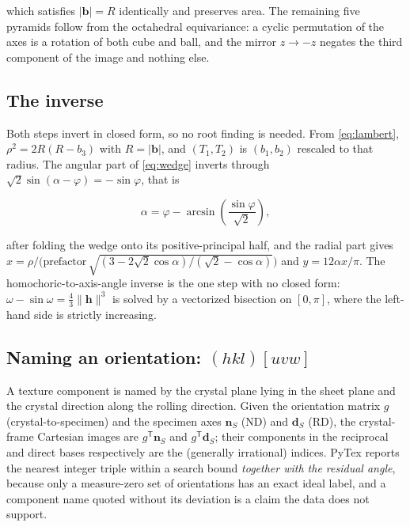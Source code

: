 which satisfies \(|\mathbf{b}| = R\) identically and preserves area. The remaining five
pyramids follow from the octahedral equivariance: a cyclic permutation of the axes is a
rotation of both cube and ball, and the mirror \(z \to -z\) negates the third component of the
image and nothing else.

\subsection{The inverse}

Both steps invert in closed form, so no root finding is needed. From \eqref{eq:lambert},
\(\rho^{2} = 2R(R - b_{3})\) with \(R = |\mathbf{b}|\), and \((T_{1},T_{2})\) is
\((b_{1},b_{2})\) rescaled to that radius. The angular part of \eqref{eq:wedge} inverts
through \(\sqrt{2}\sin(\alpha - \varphi) = -\sin\varphi\), that is

\begin{equation}
  \alpha = \varphi - \arcsin\!\left(\frac{\sin\varphi}{\sqrt{2}}\right),
\end{equation}

after folding the wedge onto its positive-principal half, and the radial part gives
\(x = \rho\big/\big(\text{prefactor}\,\sqrt{(3-2\sqrt{2}\cos\alpha)/(\sqrt{2}-\cos\alpha)}\big)\)
and \(y = 12\alpha x/\pi\). The homochoric-to-axis-angle inverse is the one step with no
closed form: \(\omega - \sin\omega = \tfrac{4}{3}\|\mathbf{h}\|^{3}\) is solved by a
vectorized bisection on \([0,\pi]\), where the left-hand side is strictly increasing.

\subsection{Naming an orientation: \texorpdfstring{\((hkl)[uvw]\)}{(hkl)[uvw]}}

A texture component is named by the crystal plane lying in the sheet plane and the crystal
direction along the rolling direction. Given the orientation matrix \(g\)
(crystal-to-specimen) and the specimen axes \(\mathbf{n}_{S}\) (ND) and \(\mathbf{d}_{S}\)
(RD), the crystal-frame Cartesian images are \(g^{\mathsf{T}}\mathbf{n}_{S}\) and
\(g^{\mathsf{T}}\mathbf{d}_{S}\); their components in the reciprocal and direct bases
respectively are the (generally irrational) indices. PyTex reports the nearest integer triple
within a search bound \emph{together with the residual angle}, because only a measure-zero set
of orientations has an exact ideal label, and a component name quoted without its deviation is
a claim the data does not support.

